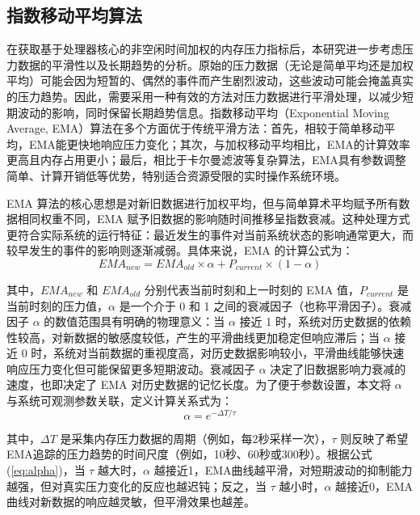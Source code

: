 \subsection{指数移动平均算法}
\label{sec:exponential_smoothing}
在获取基于处理器核心的非空闲时间加权的内存压力指标后，本研究进一步考虑压力数据的平滑性以及长期趋势的分析。原始的压力数据（无论是简单平均还是加权平均）可能会因为短暂的、偶然的事件而产生剧烈波动，这些波动可能会掩盖真实的压力趋势。因此，需要采用一种有效的方法对压力数据进行平滑处理，以减少短期波动的影响，同时保留长期趋势信息。指数移动平均（Exponential Moving Average, EMA）算法在多个方面优于传统平滑方法：首先，相较于简单移动平均，EMA能更快地响应压力变化；其次，与加权移动平均相比，EMA的计算效率更高且内存占用更小；最后，相比于卡尔曼滤波等复杂算法，EMA具有参数调整简单、计算开销低等优势，特别适合资源受限的实时操作系统环境。

EMA 算法的核心思想是对新旧数据进行加权平均，但与简单算术平均赋予所有数据相同权重不同，EMA 赋予旧数据的影响随时间推移呈指数衰减。这种处理方式更符合实际系统的运行特征：最近发生的事件对当前系统状态的影响通常更大，而较早发生的事件的影响则逐渐减弱。具体来说，EMA 的计算公式为：
\begin{equation}
    EMA_{new} = EMA_{old} \times \alpha + P_{current} \times (1 - \alpha)
    \label{eq:EMA}
\end{equation}

其中，\(EMA_{new}\) 和 \(EMA_{old}\) 分别代表当前时刻和上一时刻的 EMA 值，\(P_{current}\) 是当前时刻的压力值，\(\alpha\) 是一个介于 0 和 1 之间的衰减因子（也称平滑因子）。衰减因子 \(\alpha\) 的数值范围具有明确的物理意义：当 \(\alpha\) 接近 1 时，系统对历史数据的依赖性较高，对新数据的敏感度较低，产生的平滑曲线更加稳定但响应滞后；当 \(\alpha\) 接近 0 时，系统对当前数据的重视度高，对历史数据影响较小，平滑曲线能够快速响应压力变化但可能保留更多短期波动。衰减因子 \(\alpha\) 决定了旧数据影响力衰减的速度，也即决定了 EMA 对历史数据的记忆长度。为了便于参数设置，本文将 \(\alpha\) 与系统可观测参数关联，定义计算关系式为：
\begin{equation}
\alpha = e^{-\Delta T / \tau}
\label{eq:alpha}
\end{equation}

其中，\(\Delta T\) 是采集内存压力数据的周期（例如，每2秒采样一次），\(\tau\) 则反映了希望EMA追踪的压力趋势的时间尺度（例如，10秒、60秒或300秒）。根据公式(\ref{eq:alpha})，当 \(\tau\) 越大时，\(\alpha\) 越接近1，EMA曲线越平滑，对短期波动的抑制能力越强，但对真实压力变化的反应也越迟钝；反之，当 \(\tau\) 越小时，\(\alpha\) 越接近0，EMA曲线对新数据的响应越灵敏，但平滑效果也越差。

